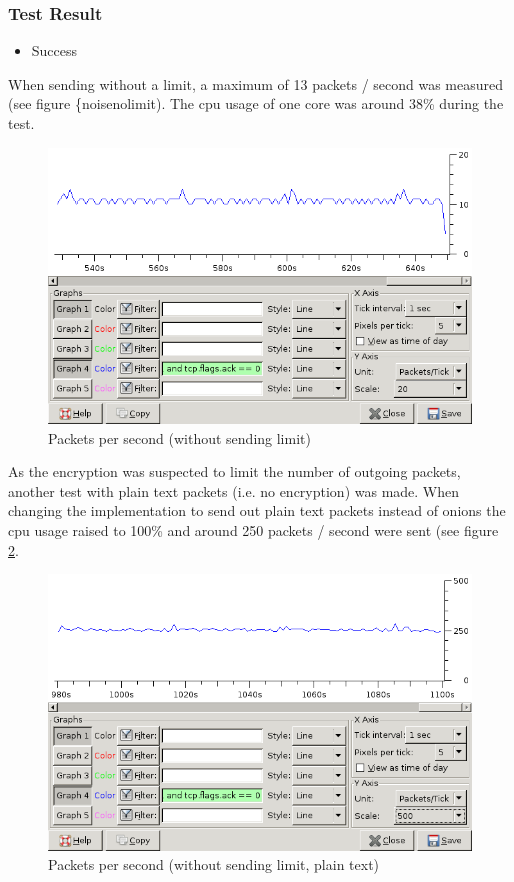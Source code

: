 \subsubsection{Test Result}
\begin{itemize}
\item Success
\end{itemize}
When sending without a limit, a maximum of 13 packets / second
was measured (see figure \{noisenolimit). The cpu
usage of one core was around 38\% during the test.
\begin{figure}[htbp]
\caption{Packets per second (without sending limit)}
\label{noisenolimit}
\centering
\includegraphics[scale=0.5]{noise-no-limit.png}
\end{figure}
As the encryption was suspected to limit the number
of outgoing packets, another test with plain text
packets (i.e. no encryption) was made.
When changing the implementation to send out 
plain text packets instead of onions the
cpu usage raised to 100\% and
around 250 packets / second were sent (see figure
\ref{noisenolimitplain}.
\begin{figure}[htbp]
\caption{Packets per second (without sending limit, plain text)}
\label{noisenolimitplain}
\centering
\includegraphics[scale=0.5]{noise-plain-no-limit.png}
\end{figure}
